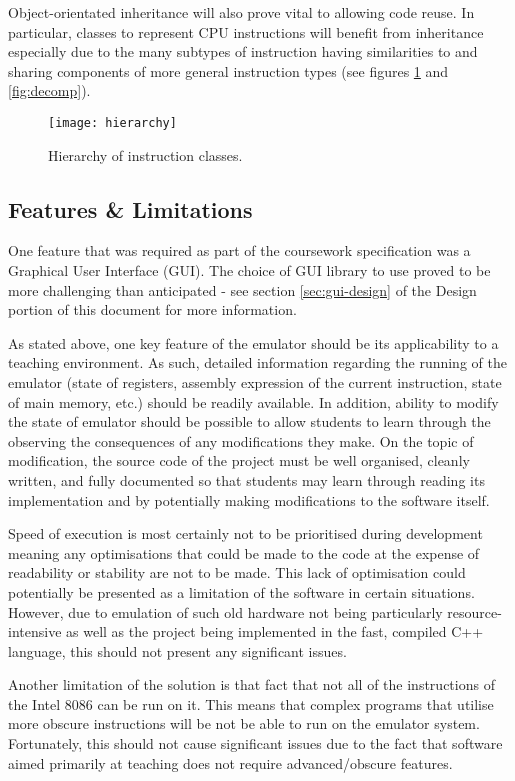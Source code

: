         Object-orientated inheritance will also prove vital to allowing code reuse. In particular, classes to represent CPU instructions will benefit from inheritance especially due to the many subtypes of instruction having similarities to and sharing components of more general instruction types (see figures \ref{fig:hierarchy} and \ref{fig:decomp}).

        \begin{figure}[ht]
            \centering
            \texttt{[image: hierarchy]}
            \caption{Hierarchy of instruction classes.}
            \label{fig:hierarchy}
        \end{figure}

\subsection{Features \& Limitations}
    One feature that was required as part of the coursework specification was a Graphical User Interface (GUI). The choice of GUI library to use proved to be more challenging than anticipated - see section \ref{sec:gui-design} of the Design portion of this document for more information.

    As stated above, one key feature of the emulator should be its applicability to a teaching environment. As such, detailed information regarding the running of the emulator (state of registers, assembly expression of the current instruction, state of main memory, etc.) should be readily available. In addition, ability to modify the state of emulator should be possible to allow students to learn through the observing the consequences of any modifications they make. On the topic of modification, the source code of the project must be well organised, cleanly written, and fully documented so that students may learn through reading its implementation and by potentially making modifications to the software itself.

    Speed of execution is most certainly not to be prioritised during development meaning any optimisations that could be made to the code at the expense of readability or stability are not to be made. This lack of optimisation could potentially be presented as a limitation of the software in certain situations. However, due to emulation of such old hardware not being particularly resource-intensive as well as the project being implemented in the fast, compiled C++ language, this should not present any significant issues.

    Another limitation of the solution is that fact that not all of the instructions of the Intel 8086 can be run on it. This means that complex programs that utilise more obscure instructions will be not be able to run on the emulator system. Fortunately, this should not cause significant issues due to the fact that software aimed primarily at teaching does not require advanced/obscure features.

